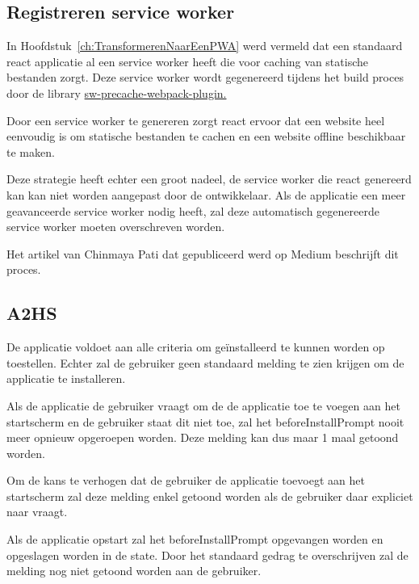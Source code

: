 	\subsection{Registreren service worker}
		
		In Hoofdstuk~\ref{ch:TransformerenNaarEenPWA} werd vermeld dat een standaard react applicatie al een service worker heeft die voor caching van statische bestanden zorgt. Deze service worker wordt gegenereerd tijdens het build proces door de library \href{https://github.com/goldhand/sw-precache-webpack-plugin}{sw-precache-webpack-plugin. }  
		\autocite{Mester2019}
		
		Door een service worker te genereren zorgt react ervoor dat een website heel eenvoudig is om statische bestanden te cachen en een website offline beschikbaar te maken.
		
		Deze strategie heeft echter een groot nadeel, de service worker die react genereerd kan kan niet worden aangepast door de ontwikkelaar. Als de applicatie een meer geavanceerde service worker nodig heeft, zal deze automatisch gegenereerde service worker moeten overschreven worden.
		
		Het artikel van Chinmaya Pati dat gepubliceerd werd op Medium beschrijft dit proces. \autocite{Pati2019}
		
	\subsection{A2HS}
	
		De applicatie voldoet aan alle criteria om geïnstalleerd te kunnen worden op toestellen. Echter zal de gebruiker geen standaard melding te zien krijgen om de applicatie te installeren.		
		
		Als de applicatie de gebruiker vraagt om de de applicatie toe te voegen aan het startscherm en de gebruiker staat dit niet toe, zal het beforeInstallPrompt nooit meer opnieuw opgeroepen worden. Deze melding kan dus maar 1 maal getoond worden.
		
		Om de kans te verhogen dat de gebruiker de applicatie toevoegt aan het startscherm zal deze melding enkel getoond worden als de gebruiker daar expliciet naar vraagt.
		\autocite{Mclachlan2020}
		
		Als de applicatie opstart zal het beforeInstallPrompt opgevangen worden en opgeslagen worden in de state. Door het standaard gedrag te overschrijven zal de melding nog niet getoond worden aan de gebruiker.
		\autocite{LePage2020b}
		

